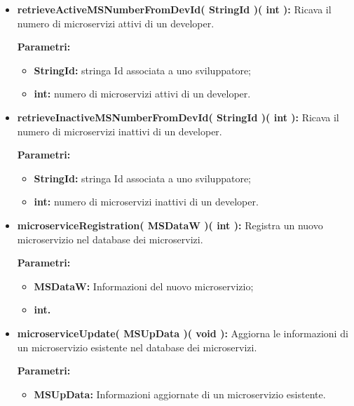 \begin{itemize}
\begin{itemize}
			\item \textbf{retrieveActiveMSNumberFromDevId( StringId )( int ):} Ricava il numero di microservizi attivi di un developer.
			\begin{description}
				\item[\textbf{Parametri:}]
			\end{description}
			\begin{itemize}
				\item \textbf{StringId:} stringa Id associata a uno sviluppatore;
				\item \textbf{int:} numero di microservizi attivi di un developer.
			\end{itemize}
		
			\item \textbf{retrieveInactiveMSNumberFromDevId( StringId )( int ):} Ricava il numero di microservizi inattivi di un developer.
			\begin{description}
				\item[\textbf{Parametri:}]
			\end{description}
			\begin{itemize}
				\item \textbf{StringId:} stringa Id associata a uno sviluppatore;
				\item \textbf{int:} numero di microservizi inattivi di un developer.
			\end{itemize}	
			
			\item \textbf{microserviceRegistration( MSDataW )( int ):} Registra un nuovo microservizio nel database dei microservizi.
			\begin{description}
				\item[\textbf{Parametri:}]
			\end{description}
			\begin{itemize}
				\item \textbf{MSDataW:} Informazioni del nuovo microservizio;
				\item \textbf{int.}
			\end{itemize}
			
			\item \textbf{microserviceUpdate( MSUpData )( void ):} Aggiorna le informazioni di un microservizio esistente nel database dei microservizi.
			\begin{description}
				\item[\textbf{Parametri:}]
			\end{description}
			\begin{itemize}
				\item \textbf{MSUpData:} Informazioni aggiornate di un microservizio esistente.
			\end{itemize}
			

\end{itemize}
\end{itemize}
